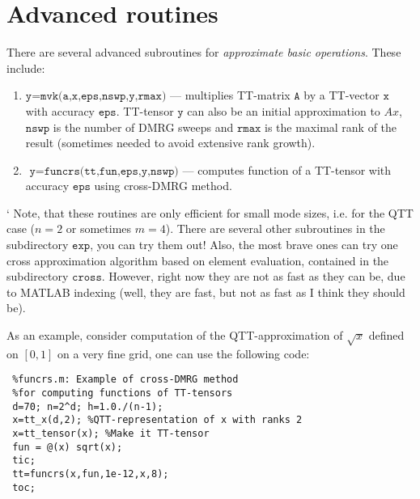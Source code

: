 \documentclass[a4paper,12pt,twoside]{article}
\begin{document}
\section{Advanced routines}
There are several advanced subroutines for \emph{approximate basic operations}. These include:
\begin{enumerate}
\item $\texttt{y=mvk(a,x,eps,nswp,y,rmax)}$ --- multiplies TT-matrix $\texttt{A}$ by a TT-vector $\texttt{x}$ 
with accuracy $\texttt{eps}$. TT-tensor $\texttt{y}$ can also be an initial approximation to $Ax$, $\texttt{nswp}$ 
is the number of DMRG sweeps and $\texttt{rmax}$ is the maximal rank of the result (sometimes needed to avoid
extensive rank growth).
\item $\texttt{ y=funcrs(tt,fun,eps,y,nswp)}$ --- computes function of a TT-tensor with accuracy $\texttt{eps}$
using cross-DMRG method.
\end{enumerate}`
Note, that these routines are only efficient for small mode sizes, i.e. for the QTT case ($n=2$ or 
sometimes $m=4$). There are several other subroutines in the subdirectory $\texttt{exp}$, you can try them out!
Also, the most brave ones can try one cross approximation algorithm based on element evaluation, contained
in the subdirectory $\texttt{cross}$. However, right now they are not as fast as they can be, due to 
MATLAB indexing (well, they are fast, but not as fast as I think they should be). 

As an example, consider computation of the QTT-approximation of $\sqrt{x}$ defined on $[0,1]$ on a very fine grid, one can use the 
following code:
\begin{lstlisting}
 %funcrs.m: Example of cross-DMRG method 
 %for computing functions of TT-tensors
 d=70; n=2^d; h=1.0./(n-1); 
 x=tt_x(d,2); %QTT-representation of x with ranks 2
 x=tt_tensor(x); %Make it TT-tensor
 fun = @(x) sqrt(x);
 tic;
 tt=funcrs(x,fun,1e-12,x,8);
 toc;
\end{lstlisting}
\end{document}
